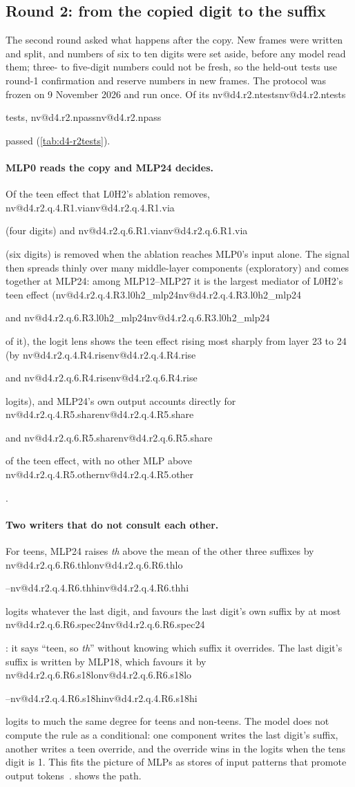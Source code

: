 \documentclass[11pt]{article}
\makeatletter
\newcommand{\nv}[1]{\ifcsname nv@#1\endcsname\csname nv@#1\endcsname\else\PackageError{numbers}{Unknown number key #1}{}\fi}
\newcommand{\hd}[2]{L#1H#2}
\newcommand{\mlp}[1]{MLP#1}
\newcommand{\sfx}[1]{\textit{#1}}
\makeatother
\begin{document}
\subsection{Round 2: from the copied digit to the suffix}
\label{sec:ord-r2}

The second round asked what happens after the copy. New frames were written and split, and numbers of six to ten digits were set aside, before any model read them; three- to five-digit numbers could not be fresh, so the held-out tests use round-1 confirmation and reserve numbers in new frames. The protocol was frozen on 9 November 2026 and run once. Of its \nv{d4.r2.ntests} tests, \nv{d4.r2.npass} passed (\cref{tab:d4-r2tests}).

\paragraph{\mlp{0} reads the copy and \mlp{24} decides.} Of the teen effect that \hd{0}{2}'s ablation removes, \nv{d4.r2.q.4.R1.via} (four digits) and \nv{d4.r2.q.6.R1.via} (six digits) is removed when the ablation reaches \mlp{0}'s input alone. The signal then spreads thinly over many middle-layer components (exploratory) and comes together at \mlp{24}: among \mlp{12}--\mlp{27} it is the largest mediator of \hd{0}{2}'s teen effect (\nv{d4.r2.q.4.R3.l0h2_mlp24} and \nv{d4.r2.q.6.R3.l0h2_mlp24} of it), the logit lens shows the teen effect rising most sharply from layer 23 to 24 (by \nv{d4.r2.q.4.R4.rise} and \nv{d4.r2.q.6.R4.rise} logits), and \mlp{24}'s own output accounts directly for \nv{d4.r2.q.4.R5.share} and \nv{d4.r2.q.6.R5.share} of the teen effect, with no other MLP above \nv{d4.r2.q.4.R5.other}.

\paragraph{Two writers that do not consult each other.} For teens, \mlp{24} raises \sfx{th} above the mean of the other three suffixes by \nv{d4.r2.q.6.R6.thlo}--\nv{d4.r2.q.4.R6.thhi} logits whatever the last digit, and favours the last digit's own suffix by at most \nv{d4.r2.q.6.R6.spec24}: it says ``teen, so \sfx{th}'' without knowing which suffix it overrides. The last digit's suffix is written by \mlp{18}, which favours it by \nv{d4.r2.q.6.R6.s18lo}--\nv{d4.r2.q.4.R6.s18hi} logits to much the same degree for teens and non-teens. The model does not compute the rule as a conditional: one component writes the last digit's suffix, another writes a teen override, and the override wins in the logits when the tens digit is 1. This fits the picture of MLPs as stores of input patterns that promote output tokens~\citep{geva2021kv}.  shows the path.
\end{document}

